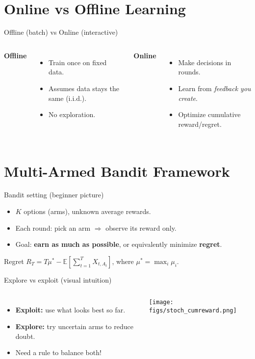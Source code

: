 \documentclass[aspectratio=169]{beamer}
\newcommand{\E}{\mathbb{E}}
\begin{document}
\section{Online vs Offline Learning}
\begin{frame}{Offline (batch) vs Online (interactive)}
\begin{columns}[T,onlytextwidth]
\textbf{Offline}
\begin{itemize}
  \item Train once on fixed data.
  \item Assumes data stays the same (i.i.d.).
  \item No exploration.
\end{itemize}
\textbf{Online}
\begin{itemize}
  \item Make decisions in rounds.
  \item Learn from \emph{feedback you create}.
  \item Optimize cumulative reward/regret.
\end{itemize}
\end{columns}
\end{frame}

\section{Multi-Armed Bandit Framework}

\begin{frame}{Bandit setting (beginner picture)}
\small
\begin{itemize}
  \item $K$ options (arms), unknown average rewards.
  \item Each round: pick an arm $\Rightarrow$ observe its reward only.
  \item Goal: \textbf{earn as much as possible}, or equivalently minimize \textbf{regret}.
\end{itemize}
\begin{block}{Regret}
$R_T = T\mu^* - \E\!\left[\sum_{t=1}^T X_{t,A_t}\right]$, where $\mu^*=\max_i \mu_i$.
\end{block}
\end{frame}

\begin{frame}{Explore vs exploit (visual intuition)}
\begin{columns}[T,onlytextwidth]
\begin{itemize}
  \item \textbf{Exploit:} use what looks best so far.
  \item \textbf{Explore:} try uncertain arms to reduce doubt.
  \item Need a rule to balance both!
\end{itemize}
\begin{center}
\texttt{[image: figs/stoch\_cumreward.png]}
\end{center}
\end{columns}
\end{frame}
\end{document}
